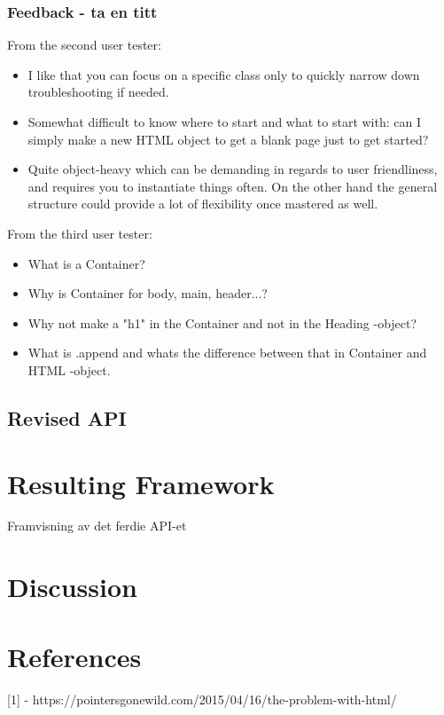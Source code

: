 \documentclass[12pt]{article}
\begin{document}
        \subsubsection{Feedback - ta en titt}
        From the second user tester:
        \begin{itemize}
            \item I like that you can focus on a specific class only to quickly narrow down troubleshooting if needed.
            \item Somewhat difficult to know where to start and what to start with: can I simply make a new HTML object to get a blank page just to get started?
            \item Quite object-heavy which can be demanding in regards to user friendliness, and requires you to instantiate things often. On the other hand the general structure could provide a lot of flexibility once mastered as well.
        \end{itemize}

        From the third user tester:
        \begin{itemize}
            \item What is a Container?
            \item Why is Container for body, main, header...?
            \item Why not make a "h1" in the Container and not in the Heading -object?
            \item What is .append and whats the difference between that in Container and HTML -object.
        \end{itemize}


    \subsection{Revised API}

\section{Resulting Framework}
Framvisning av det ferdie API-et

\section{Discussion}

\section{References}
[1] - https://pointersgonewild.com/2015/04/16/the-problem-with-html/
\end{document}

